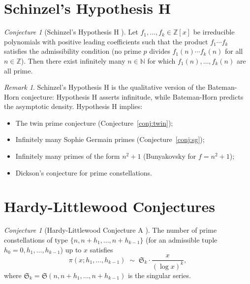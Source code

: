\documentclass[12pt,a4paper]{amsart}
\theoremstyle{definition}
\theoremstyle{remark}
\newtheorem{remark}[theorem]{Remark}
\newtheorem{conjecture}[theorem]{Conjecture}
\newcommand{\Z}{\mathbb{Z}}
\newcommand{\N}{\mathbb{N}}
\newcommand{\BH}{\mathfrak{S}}
\begin{document}
\section{Schinzel's Hypothesis H}\label{sec:schinzel}

\begin{conjecture}[Schinzel's Hypothesis H \cite{Schinzel1958}]
  \label{conj:hypothesis_h}
  Let $f_1, \ldots, f_k \in \Z[x]$ be irreducible polynomials with positive leading
  coefficients such that the product $f_1 \cdots f_k$ satisfies the admissibility
  condition (no prime $p$ divides $f_1(n)\cdots f_k(n)$ for all $n \in \Z$).
  Then there exist infinitely many $n \in \N$ for which $f_1(n), \ldots, f_k(n)$ are
  all prime.
\end{conjecture}

\begin{remark}
  Schinzel's Hypothesis H is the qualitative version of the Bateman-Horn conjecture:
  Hypothesis H asserts infinitude, while Bateman-Horn predicts the asymptotic density.
  Hypothesis H implies:
  \begin{itemize}
    \item The twin prime conjecture (Conjecture~\ref{conj:twin});
    \item Infinitely many Sophie Germain primes (Conjecture~\ref{conj:sg});
    \item Infinitely many primes of the form $n^2+1$ (Bunyakovsky for $f=n^2+1$);
    \item Dickson's conjecture for prime constellations.
  \end{itemize}
\end{remark}

\section{Hardy-Littlewood Conjectures}\label{sec:hardy_lw}

\begin{conjecture}[Hardy-Littlewood Conjecture A \cite{HL1923}]
  \label{conj:HLA}
  The number of prime constellations of type $\{n, n+h_1, \ldots, n+h_{k-1}\}$ (for
  an admissible tuple $h_0=0, h_1, \ldots, h_{k-1}$) up to $x$ satisfies
  \[
    \pi(x; h_1,\ldots,h_{k-1}) \;\sim\; \BH_k \cdot \frac{x}{(\log x)^k},
  \]
  where $\BH_k = \BH(n, n+h_1, \ldots, n+h_{k-1})$ is the singular series.
\end{conjecture}
\end{document}
